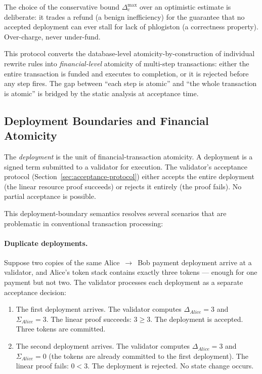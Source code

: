 \documentclass[11pt,a4paper]{article}
\begin{document}
\noindent
The choice of the conservative bound $\Delta_c^{\max}$ over an
optimistic estimate is deliberate: it trades a refund (a
benign inefficiency) for the guarantee that no accepted
deployment can ever stall for lack of phlogiston (a
correctness property).  Over-charge, never under-fund.

\noindent
This protocol converts the database-level
atomicity-by-construction of individual rewrite rules into
\emph{financial-level} atomicity of multi-step transactions:
either the entire transaction is funded and executes to
completion, or it is rejected before any step fires.  The gap
between ``each step is atomic'' and ``the whole transaction is
atomic'' is bridged by the static analysis at acceptance time.

\subsection{Deployment Boundaries and Financial Atomicity}
\label{sec:deploy-boundaries}

The \emph{deployment} is the unit of financial-transaction
atomicity.  A deployment is a signed term submitted to a
validator for execution.  The validator's acceptance protocol
(Section~\ref{sec:acceptance-protocol}) either accepts the
entire deployment (the linear resource proof succeeds) or
rejects it entirely (the proof fails).  No partial acceptance
is possible.

This deployment-boundary semantics resolves several scenarios
that are problematic in conventional transaction processing:

\paragraph{Duplicate deployments.}
Suppose two copies of the same Alice~$\to$~Bob payment
deployment arrive at a validator, and Alice's token stack
contains exactly three tokens --- enough for one payment but
not two.  The validator processes each deployment as a
separate acceptance decision:

\begin{enumerate}[nosep]
  \item The first deployment arrives.  The validator computes
    $\Delta_{\mathit{Alice}} = 3$ and $\Sigma_{\mathit{Alice}}
    = 3$.  The linear proof succeeds: $3 \geq 3$.  The
    deployment is accepted.  Three tokens are committed.
  \item The second deployment arrives.  The validator computes
    $\Delta_{\mathit{Alice}} = 3$ and $\Sigma_{\mathit{Alice}}
    = 0$ (the tokens are already committed to the first
    deployment).  The linear proof fails: $0 < 3$.  The
    deployment is rejected.  No state change occurs.
\end{enumerate}
\end{document}
